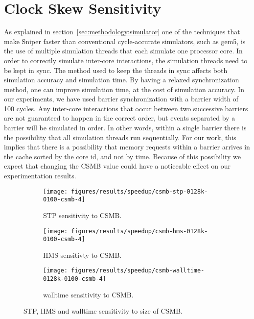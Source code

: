 
\section{Clock Skew Sensitivity}
\label{sec:results:csmb_sensitivity}

As explained in section~\ref{sec:methodology:simulator} one of the techniques that make Sniper faster than conventional cycle-accurate simulators, such as gem5, is the use of multiple simulation threads that each simulate one processor core.
In order to correctly simulate inter-core interactions, the simulation threads need to be kept in sync.
The method used to keep the threads in sync affects both simulation accuracy and simulation time.
By having a relaxed synchronization method, one can improve simulation time, at the cost of simulation accuracy.
In our experiments, we have used barrier synchronization with a barrier width of 100 cycles.
Any inter-core interactions that occur between two successive barriers are not guaranteed to happen in the correct order, but events separated by a barrier will be simulated in order.
In other words, within a single barrier there is the possibility that all simulation threads run sequentially.
For our work, this implies that there is a possibility that memory requests within a barrier arrives in the cache sorted by the core id, and not by time.
Because of this possibility we expect that changing the CSMB value could have a noticeable effect on our experimentation results.

\begin{figure}[!htb]
    \centering
    \begin{subfigure}[b]{0.5\textwidth}
        \texttt{[image: figures/results/speedup/csmb-stp-0128k-0100-csmb-4]}
        \caption{STP sensitivity to CSMB.}
        \label{fig:results:csmb:stp}
    \end{subfigure}%
    \begin{subfigure}[b]{0.5\textwidth}
        \texttt{[image: figures/results/speedup/csmb-hms-0128k-0100-csmb-4]}
        \caption{HMS sensitivty to CSMB.}
        \label{fig:results:csmb:hms}
    \end{subfigure}
    \begin{subfigure}[b]{0.6\textwidth}
        \texttt{[image: figures/results/speedup/csmb-walltime-0128k-0100-csmb-4]}
        \caption{walltime sensitivity to CSMB.}
        \label{fig:results:csmb:mpki}
    \end{subfigure}
    \caption{STP, HMS and walltime sensitivity to size of CSMB.}
    \label{fig:results:csmb}
\end{figure}


